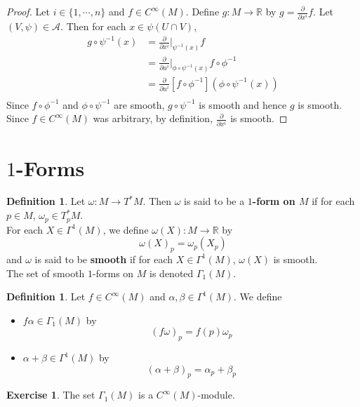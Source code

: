 \documentclass{book}
\theoremstyle{definition}
\newtheorem{defn}[definition]{Definition}
\newtheorem{ex}[definition]{Exercise}
\newcommand{\al}{\alpha}
\newcommand{\be}{\beta}
\newcommand{\om}{\omega}
\newcommand{\Gam}{\Gamma}
\newcommand{\R}{\mathbb{R}}
\newcommand{\MA}{\mathcal{A}}
\DeclareMathOperator*{\0}{\mbf{0}}
\DeclareMathOperator*{\1}{\mbf{1}}
\newcommand{\tbf}[1]{\textbf{#1}}
\newcommand{\p}{\partial}
\begin{document}
	\begin{proof}
	Let $i \in \{1, \cdots, n\}$ and $f \in C^{\infty}(M)$. Define $g: M \rightarrow \R$ by $g =\frac{\p}{\p x^i} f$. Let $(V, \psi) \in \MA$. Then for each $x \in \psi(U \cap V)$, 
	\begin{align*}
	g \circ \psi^{-1}(x) 
	&= \frac{\p}{\p x^i} \bigg|_{\psi^{-1}(x)}f \\
	&= \frac{\p}{\p u^i} \bigg|_{\phi \circ \psi^{-1}(x)}f \circ \phi^{-1}  \\
	&= \frac{\p}{\p u^i}[f \circ \phi^{-1}] ( \phi \circ \psi^{-1} (x))\\
\end{align*}	 
	Since $f \circ \phi^{-1}$ and $\phi \circ \psi^{-1}$ are smooth, $g \circ \psi^{-1}$ is smooth and hence $g$ is smooth. Since $f \in C^{\infty}(M)$ was arbitrary, by definition, $\frac{\p}{\p x^i}$ is smooth. 
	\end{proof}
	
	
	
	
	
	
	
	\newpage
	\section{$1$-Forms}
	
	\begin{defn}
		Let $\om: M \rightarrow T^*M$. Then $\om$ is said to be a \tbf{$1$-form on $M$} if for each $p \in M$, $\om_p \in T^*_p M$. \\
		For each $X \in \Gam^1(M)$, we define $\om(X) : M \rightarrow \R$ by $$\om(X)_p = \om_p(X_p)$$
		and $\om$ is said to be \tbf{smooth} if for each $X \in \Gam^1(M)$, $\om(X)$ is smooth. \\
		The set of smooth $1$-forms on $M$ is denoted $\Gam_1(M)$.\\
	\end{defn}

	\begin{defn}
	Let $f \in C^{\infty}(M)$ and $\al,\be \in \Gam^1(M)$. We define 
	\begin{itemize}
	\item $f\al \in \Gam_1(M)$ by $$(f\om)_p = f(p)\om_p$$
	\item $\al+\be \in \Gam^1(M)$ by $$(\al+\be)_p = \al_p+\be_p$$
	\end{itemize}
	\end{defn}
	
	\begin{ex}
	The set $\Gam_1(M)$ is a $C^{\infty}(M)$-module.
	\end{ex}
	
\end{document}
